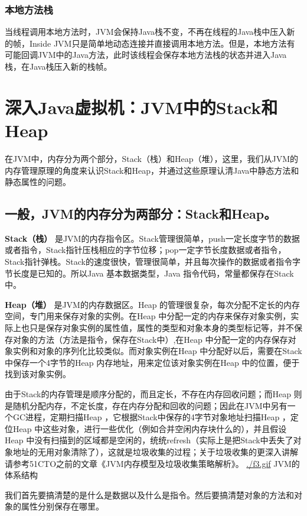\documentclass[10pt,b5paper]{article}
\begin{document}
\subsubsection{本地方法栈}
\label{sec-3-1-5}

当线程调用本地方法时，JVM会保持Java栈不变，不再在线程的Java栈中压入新的帧，Inside JVM只是简单地动态连接并直接调用本地方法。但是，本地方法有可能回调JVM中的Java方法，此时该线程会保存本地方法栈的状态并进入Java栈，在Java栈压入新的栈帧。
\section{深入Java虚拟机：JVM中的Stack和Heap}
\label{sec-4}
在JVM中，内存分为两个部分，Stack（栈）和Heap（堆），这里，我们从JVM的内存管理原理的角度来认识Stack和Heap，并通过这些原理认清Java中静态方法和静态属性的问题。

\subsection{一般，JVM的内存分为两部分：Stack和Heap。}
\label{sec-4-1}

\textbf{Stack（栈）} 是JVM的内存指令区。Stack管理很简单，push一定长度字节的数据或者指令，Stack指针压栈相应的字节位移；pop一定字节长度数据或者指令，Stack指针弹栈。Stack的速度很快，管理很简单，并且每次操作的数据或者指令字节长度是已知的。所以Java 基本数据类型，Java 指令代码，常量都保存在Stack中。

\textbf{Heap（堆）} 是JVM的内存数据区。Heap 的管理很复杂，每次分配不定长的内存空间，专门用来保存对象的实例。在Heap 中分配一定的内存来保存对象实例，实际上也只是保存对象实例的属性值，属性的类型和对象本身的类型标记等，并不保存对象的方法（方法是指令，保存在Stack中）,在Heap 中分配一定的内存保存对象实例和对象的序列化比较类似。而对象实例在Heap 中分配好以后，需要在Stack中保存一个4字节的Heap 内存地址，用来定位该对象实例在Heap 中的位置，便于找到该对象实例。

由于Stack的内存管理是顺序分配的，而且定长，不存在内存回收问题；而Heap 则是随机分配内存，不定长度，存在内存分配和回收的问题；因此在JVM中另有一个GC进程，定期扫描Heap ，它根据Stack中保存的4字节对象地址扫描Heap ，定位Heap 中这些对象，进行一些优化（例如合并空闲内存块什么的），并且假设Heap 中没有扫描到的区域都是空闲的，统统refresh（实际上是把Stack中丢失了对象地址的无用对象清除了），这就是垃圾收集的过程；关于垃圾收集的更深入讲解请参考51CTO之前的文章《JVM内存模型及垃圾收集策略解析》。
\url{./f3.gif}
JVM的体系结构 

我们首先要搞清楚的是什么是数据以及什么是指令。然后要搞清楚对象的方法和对象的属性分别保存在哪里。
\end{document}
